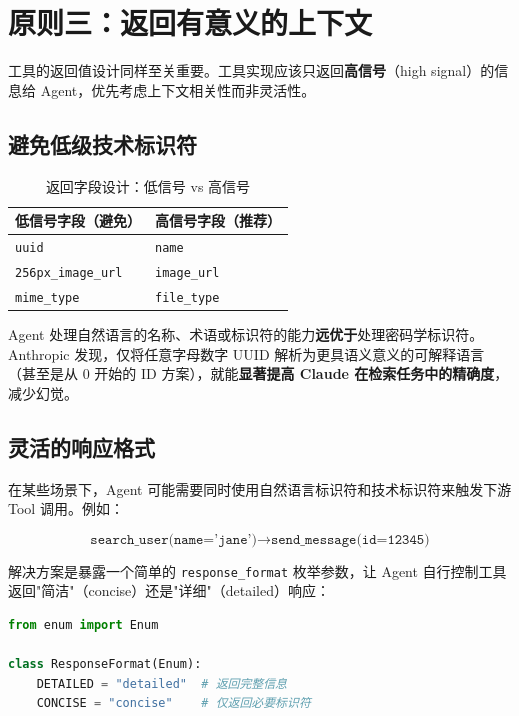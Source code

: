 \section{原则三：返回有意义的上下文}

工具的返回值设计同样至关重要。工具实现应该只返回\textbf{高信号}（high signal）的信息给 Agent，优先考虑上下文相关性而非灵活性。

\subsection{避免低级技术标识符}

\begin{table}[H]
\centering
\caption{返回字段设计：低信号 vs 高信号}
\begin{tabular}{p{}p{}}
\toprule
\textbf{低信号字段（避免）} & \textbf{高信号字段（推荐）} \\
\midrule
\texttt{uuid} & \texttt{name} \\
\texttt{256px\_image\_url} & \texttt{image\_url} \\
\texttt{mime\_type} & \texttt{file\_type} \\
\bottomrule
\end{tabular}
\end{table}

Agent 处理自然语言的名称、术语或标识符的能力\textbf{远优于}处理密码学标识符。Anthropic 发现，仅将任意字母数字 UUID 解析为更具语义意义的可解释语言（甚至是从 0 开始的 ID 方案），就能\textbf{显著提高 Claude 在检索任务中的精确度}，减少幻觉。

\subsection{灵活的响应格式}

在某些场景下，Agent 可能需要同时使用自然语言标识符和技术标识符来触发下游 Tool 调用。例如：

$$\texttt{search\_user(name='jane')} \rightarrow \texttt{send\_message(id=12345)}$$

解决方案是暴露一个简单的 \texttt{response\_format} 枚举参数，让 Agent 自行控制工具返回"简洁"（concise）还是"详细"（detailed）响应：

\begin{lstlisting}[language=Python, caption={ResponseFormat 枚举示例}]
from enum import Enum

class ResponseFormat(Enum):
    DETAILED = "detailed"  # 返回完整信息
    CONCISE = "concise"    # 仅返回必要标识符
\end{lstlisting}

